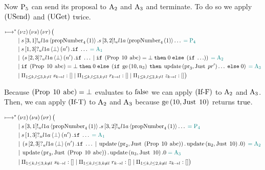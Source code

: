 Now $\Proposer{5}$ can send its proposal to $\Acceptor{2}$ and $\Acceptor{3}$ and terminate.
To do so we apply $\RUsend$ and $\RUget$ twice.

\begin{align*}
\mapstostar&\NuChannels\big (\\
&\Or
\SendUnreliableP{\ChannelS}{3}{1}{\LOneA}{\proposalNumber{1}{4}}.
\SendUnreliableP{\ChannelS}{3}{2}{\LOneA}{\proposalNumber{1}{4}}\ldots
\comment{= \Proposer{4}}\\
&\Or \ReceiveUnreliableP{\ChannelS}{1}{3}{\LOneA}{\bot}{n'}.\If \ldots \comment{= \Acceptor{1}}\\
&\Or
    \Paren{
        \ReceiveUnreliableP{\ChannelS}{2}{3}{\LOneA}{\bot}{n'}.\If \ldots
        \Or
        \If \Paren{\ProposalC{10}{\ABC}} = \bot
        \;\Then \End
        \;\Else \Paren{\If \ldots}
    } \comment{= \Acceptor{2}}\\
&\Or
    \If \Paren{\ProposalC{10}{\ABC}} = \bot
    \;\Then \End
    \;\Else \Paren{
        \If \greaterEqual{10}{\NumberRegister_3}
        \;\Then \update{\ProposalRegister_3}{\Just{pr'}}\ldots
        \;\Else \End
    }
    \comment{= \Acceptor{3}}\\
&\Or \InnerSessionQueues{\ChannelS}
\Or \InnerSessionQueues{\ChannelR}
\Or \OuterSessionQueues
\big )
\end{align*}

Because $\Paren{\ProposalC{10}{\ABC}} = \bot$ evaluates to $\False$ we can apply $\RIfF$ to $\Acceptor{2}$ and $\Acceptor{3}$.
Then, we can apply $\RIfT$ to $\Acceptor{2}$ and $\Acceptor{3}$ because $\greaterEqual{10}{\Just{10}}$ returns $\True$.

\begin{align*}
\mapstostar&\NuChannels\big (\\
&\Or
\SendUnreliableP{\ChannelS}{3}{1}{\LOneA}{\proposalNumber{1}{4}}.
\SendUnreliableP{\ChannelS}{3}{2}{\LOneA}{\proposalNumber{1}{4}}\ldots
\comment{= \Proposer{4}}\\
&\Or \ReceiveUnreliableP{\ChannelS}{1}{3}{\LOneA}{\bot}{n'}.\If \ldots \comment{= \Acceptor{1}}\\
&\Or
    \Paren{
        \ReceiveUnreliableP{\ChannelS}{2}{3}{\LOneA}{\bot}{n'}.\If \ldots
        \Or
            \update{\ProposalRegister_2}{\Just{\Paren{\ProposalC{10}{\ABC}}}}.
            \update{\NumberRegister_2}{\Just{10}}.
            \End
    } \comment{= \Acceptor{2}}\\
&\Or
    \update{\ProposalRegister_3}{\Just{\Paren{\ProposalC{10}{\ABC}}}}.
    \update{\NumberRegister_3}{\Just{10}}.
    \End
    \comment{= \Acceptor{3}}\\
&\Or \InnerSessionQueues{\ChannelS}
\Or \InnerSessionQueues{\ChannelR}
\Or \OuterSessionQueues
\big )
\end{align*}

